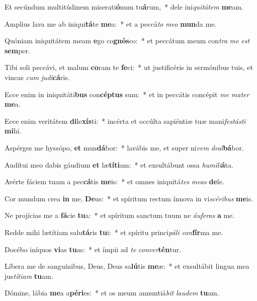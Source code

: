 \item Et secúndum multitúdinem miserati\textbf{ó}num tu\textbf{á}rum,~* dele ini\textit{qui}\textit{tá}\textit{tem} \textbf{me}am.
\item Amplius lava me ab iniqui\textbf{tá}te \textbf{me}a:~* et a peccá\textit{to} \textit{me}\textit{o} \textbf{mun}da me.
\item Quóniam iniquitátem meam \textbf{e}go co\textbf{gnós}co:~* et peccátum meum con\textit{tra} \textit{me} \textit{est} \textbf{sem}per.
\item Tibi soli peccávi, et malum \textbf{co}ram te \textbf{fe}ci:~* ut justificéris in sermónibus tuis, et vincas \textit{cum} \textit{ju}\textit{di}\textbf{cá}ris.
\item Ecce enim in iniquitáti\textbf{bus} con\textbf{cép}\textbf{tus} sum:~* et in peccátis concépit \textit{me} \textit{ma}\textit{ter} \textbf{me}a.
\item Ecce enim veritátem \textbf{di}le\textbf{xís}ti:~* incérta et occúlta sapiéntiæ tuæ mani\textit{fes}\textit{tás}\textit{ti} \textbf{mi}hi.
\item Aspérges me hyssópo, \textbf{et} mun\textbf{dá}bor:~* lavábis me, et super ni\textit{vem} \textit{de}\textit{al}\textbf{bá}bor.
\item Audítui meo dabis gáudium \textbf{et} læ\textbf{tí}\textbf{ti}am:~* et exsultábunt ossa \textit{hu}\textit{mi}\textit{li}\textbf{á}ta.
\item Avérte fáciem tuam a pec\textbf{cá}tis \textbf{me}is:~* et omnes iniquitá\textit{tes} \textit{me}\textit{as} \textbf{de}le.
\item Cor mundum crea \textbf{in} me, \textbf{De}us:~* et spíritum rectum ínnova in vi\textit{scé}\textit{ri}\textit{bus} \textbf{me}is.
\item Ne projícias me a \textbf{fá}cie \textbf{tu}a:~* et spíritum sanctum tuum ne \textit{áu}\textit{fe}\textit{ras} \textbf{a} me.
\item Redde mihi lætítiam salu\textbf{tá}ris \textbf{tu}i:~* et spíritu princi\textit{pá}\textit{li} \textit{con}\textbf{fír}ma me.
\item Docébo iníquos \textbf{vi}as \textbf{tu}as:~* et ímpii ad \textit{te} \textit{con}\textit{ver}\textbf{tén}tur.
\item Líbera me de sanguínibus, Deus, Deus sa\textbf{lú}tis \textbf{me}æ:~* et exsultábit lingua mea jus\textit{tí}\textit{ti}\textit{am} \textbf{tu}am.
\item Dómine, lábia \textbf{me}a a\textbf{pé}\textbf{ri}es:~* et os meum annuntiá\textit{bit} \textit{lau}\textit{dem} \textbf{tu}am.
